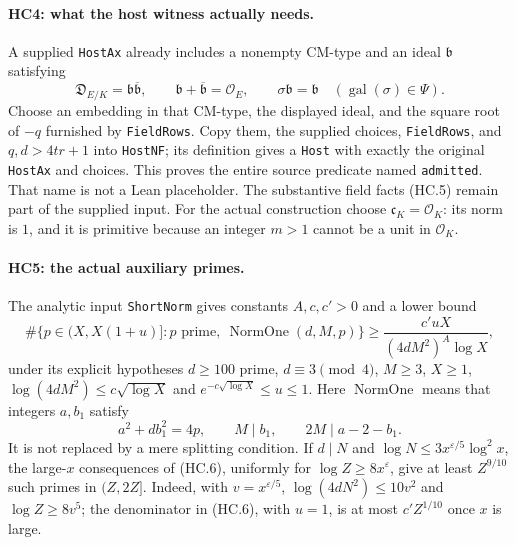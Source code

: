 \paragraph{HC4: what the host witness actually needs.}
A supplied \texttt{HostAx} already includes a nonempty CM-type and
an ideal $\mathfrak b$ satisfying
\[
 \mathfrak D_{E/K}=\mathfrak b\overline{\mathfrak b},
 \qquad \mathfrak b+\overline{\mathfrak b}=\mathcal O_E,
 \qquad \sigma\mathfrak b=\mathfrak b\quad
                   (\operatorname{gal}(\sigma)\in\Psi).       \tag{HC.5}
\]
Choose an embedding in that CM-type, the displayed ideal, and the
square root of $-q$ furnished by \texttt{FieldRows}. Copy them,
the supplied choices, \texttt{FieldRows}, and $q,d>4tr+1$ into
\texttt{HostNF}; its definition gives a \texttt{Host} with exactly
the original \texttt{HostAx} and choices. This proves the entire
source predicate named \texttt{admitted}. That name is not a
Lean placeholder. The substantive field facts (HC.5) remain
part of the supplied input. For the actual construction choose
$\mathfrak c_K=\mathcal O_K$: its norm is $1$, and it is primitive
because an integer $m>1$ cannot be a unit in $\mathcal O_K$.

\paragraph{HC5: the actual auxiliary primes.}
The analytic input \texttt{ShortNorm} gives constants $A,c,c'>0$
and a lower bound
\[
 \#\{p\in(X,X(1+u)]:p\text{ prime},\ \operatorname{NormOne}(d,M,p)\}
 \ge\frac{c'uX}{(4dM^2)^A\log X},                    \tag{HC.6}
\]
under its explicit hypotheses
$d\ge100$ prime, $d\equiv3\pmod4$, $M\ge3$, $X\ge1$,
$\log(4dM^2)\le c\sqrt{\log X}$ and
$e^{-c\sqrt{\log X}}\le u\le1$.
Here $\operatorname{NormOne}$ means that integers $a,b_1$ satisfy
\[
 a^2+db_1^2=4p,\qquad M\mid b_1,\qquad 2M\mid a-2-b_1.
                                                               \tag{HC.7}
\]
It is not replaced by a mere splitting condition.
If $d\mid N$ and $\log N\le3x^{\varepsilon/5}\log^2x$, the
large-$x$ consequences of (HC.6), uniformly for
$\log Z\ge8x^\varepsilon$, give at least $Z^{9/10}$ such
primes in $(Z,2Z]$. Indeed, with $v=x^{\varepsilon/5}$,
$\log(4dN^2)\le10v^2$ and $\log Z\ge8v^5$;
the denominator in (HC.6), with $u=1$, is at most
$c'Z^{1/10}$ once $x$ is large.

